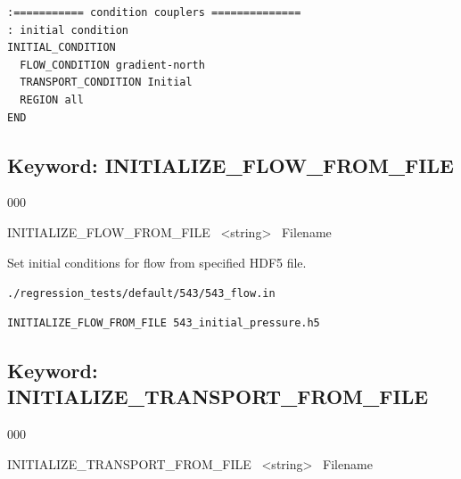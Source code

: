 
\begin{mdframed}


\footnotesize
\begin{verbatim}
:=========== condition couplers ==============
: initial condition
INITIAL_CONDITION
  FLOW_CONDITION gradient-north
  TRANSPORT_CONDITION Initial
  REGION all
END
\end{verbatim}
\normalsize
\end{mdframed}

\hyperlink{target_key}{\return}



\newpage
\protect\hypertarget{target_init_flow}{}

\subsection{Keyword: INITIALIZE\_FLOW\_FROM\_FILE}

\hfill\hyperlink{target_key}{\return}

\begin{deflist}{000}
\item[INITIALIZE\_FLOW\_FROM\_FILE] \ <string> \ Filename
\end{deflist}

 Set initial conditions for flow from specified HDF5 file.

\begin{mdframed}
 {\footnotesize\tt ./regression\_tests/default/543/543\_flow.in}
\footnotesize
\begin{verbatim}
INITIALIZE_FLOW_FROM_FILE 543_initial_pressure.h5
\end{verbatim}
\normalsize
\end{mdframed}

\protect\hypertarget{target_init_trans}{}

\subsection{Keyword: INITIALIZE\_TRANSPORT\_FROM\_FILE}


\begin{deflist}{000}
\item[INITIALIZE\_TRANSPORT\_FROM\_FILE] \ <string> \ Filename
\end{deflist}

